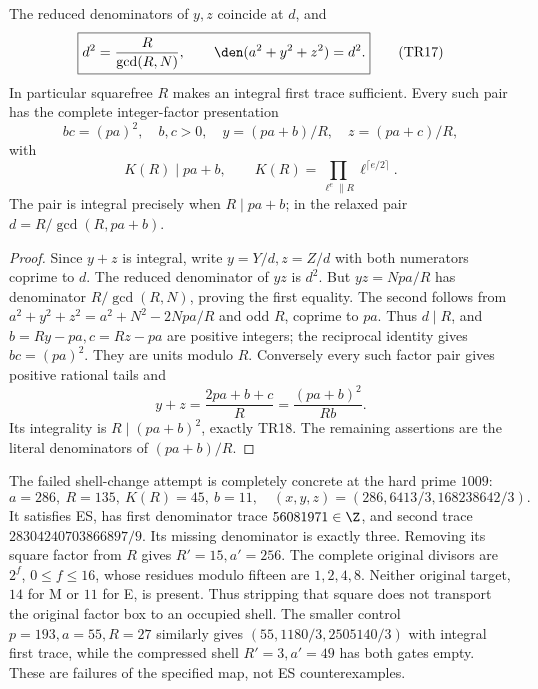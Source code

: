 \begin{theorem}\label{thm:tail}
The reduced denominators of $y,z$ coincide at $d$, and
\[
 \boxed{d^2=\frac R{\gcd(R,N)},\qquad
 \den(a^2+y^2+z^2)=d^2.}                                \tag{TR17}
\]
In particular squarefree $R$ makes an integral first trace sufficient.
Every such pair has the complete integer-factor presentation
\[
 b c=(pa)^2,\quad b,c>0,\quad
 y=(pa+b)/R,\quad z=(pa+c)/R,
\]
with
\[
 \boxed{K(R)\mid pa+b,\qquad
 K(R)=\prod_{\ell^e\parallel R}\ell^{\lceil e/2\rceil}.} \tag{TR18}
\]
The pair is integral precisely when $R\mid pa+b$; in the relaxed pair
$d=R/\gcd(R,pa+b)$.
\end{theorem}
\begin{proof}
Since $y+z$ is integral, write $y=Y/d,z=Z/d$ with both numerators coprime to $d$.
The reduced denominator of $yz$ is $d^2$. But $yz=Npa/R$ has denominator
$R/\gcd(R,N)$, proving the first equality. The second follows from
$a^2+y^2+z^2=a^2+N^2-2Npa/R$ and odd $R$, coprime to $pa$.
Thus $d\mid R$, and $b=Ry-pa,c=Rz-pa$ are positive integers; the reciprocal
identity gives $bc=(pa)^2$. They are units modulo $R$. Conversely every such
factor pair gives positive rational tails and
\[
 y+z=\frac{2pa+b+c}{R}=\frac{(pa+b)^2}{Rb}.
\]
Its integrality is $R\mid(pa+b)^2$, exactly TR18. The remaining assertions
are the literal denominators of $(pa+b)/R$.
\end{proof}

The failed shell-change attempt is completely concrete at the hard prime $1009$:
\[
 \boxed{a=286,\ R=135,\ K(R)=45,\ b=11,\quad
 (x,y,z)=(286,6413/3,168238642/3).}                      \tag{TR19}
\]
It satisfies ES, has first denominator trace $56081971\in\Z$, and second trace
$28304240703866897/9$. Its missing denominator is exactly three. Removing its
square factor from $R$ gives $R'=15,a'=256$. The complete original divisors are
$2^f$, $0\le f\le16$, whose residues modulo fifteen are $1,2,4,8$.
Neither original target, $14$ for M or $11$ for E, is present. Thus stripping
that square does not transport the original factor box to an occupied shell.
The smaller control $p=193,a=55,R=27$ similarly gives
$(55,1180/3,2505140/3)$ with integral first trace, while the compressed shell
$R'=3,a'=49$ has both gates empty. These are failures of the specified map,
not ES counterexamples.

